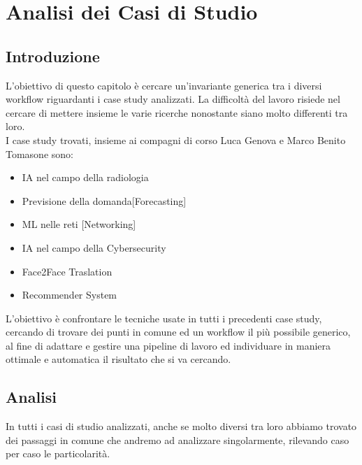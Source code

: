 \documentclass[../tesi.tex]{subfiles}
\begin{document}
\chapter{Analisi dei Casi di Studio}
\section{Introduzione}
L’obiettivo di questo capitolo è cercare un'invariante generica tra i diversi workflow riguardanti i case study analizzati. La difficoltà del lavoro risiede nel cercare di mettere insieme le varie ricerche nonostante siano molto differenti tra loro.\\
I case study trovati, insieme ai compagni di corso Luca Genova e Marco Benito Tomasone sono:
\begin{itemize}
  \item IA nel campo della radiologia
  \item	Previsione della domanda[Forecasting]
  \item ML nelle reti [Networking]
  \item	IA nel campo della Cybersecurity
  \item Face2Face Traslation
  \item	Recommender System 
\end{itemize}
L’obiettivo è confrontare le tecniche usate in tutti i precedenti case study, cercando di trovare dei punti in comune ed un workflow il più possibile generico, al fine di adattare e gestire una \Gls{pipeline} di lavoro ed individuare in maniera ottimale e automatica il risultato che si va cercando.

\section{Analisi}
In tutti i casi di studio analizzati, anche se molto diversi tra loro abbiamo trovato dei passaggi in comune che andremo ad analizzare singolarmente, rilevando caso per caso le particolarità.
\end{document}
